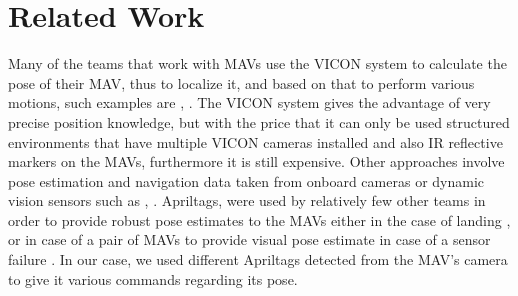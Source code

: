 \section{Related Work}
\label{sec:related_work}
  
Many of the teams that work with MAVs use the VICON system to calculate the pose of their MAV, thus to localize it, and based on that to perform various motions, such examples are \cite{Mellinger:2012:TGC:2190635.2190636}, \cite{ducSIES09}. The VICON system gives the advantage of very precise position knowledge, but with the price that it can only be used structured environments that have multiple VICON cameras installed and also IR reflective markers on the MAVs, furthermore it is still expensive. Other approaches involve pose estimation and navigation data taken from onboard cameras or dynamic vision sensors such as \cite{6880770}, \cite{6942940}. Apriltags, were used by relatively few other teams in order to provide robust pose estimates to the MAVs either in the case of landing \cite{schaves-2015a}, \cite{lingkevin2014} or in case of a pair of MAVs to provide visual pose estimate in case of a sensor failure \cite{hoogervorst2015bsc}. In our case, we used different Apriltags detected from the MAV's camera to give it various commands regarding its pose.
